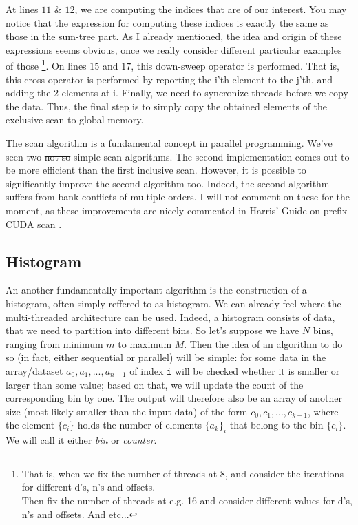 At lines $11$ \& $12$, we are computing the indices that are of our interest. You may notice that the 
expression for computing these indices is exactly the same as those in the sum-tree part. As I already 
mentioned, the idea and origin of these expressions seems obvious, once we really consider different 
particular examples of those \footnote{That is, when we fix the number of threads at 8, and consider the iterations for different d's, n's and offsets. \\
Then fix the number of threads at e.g. 16 and consider different values for d's, n's and offsets. And 
etc...}. On lines $15$ and $17$, this down-sweep operator is performed. That is, this cross-operator 
is performed by reporting the i'th element to the j'th, and adding the 2 elements at i.
Finally, we need to syncronize threads before we copy the data. Thus, the final step is to simply copy 
the obtained elements of the exclusive scan to global memory.


The scan algorithm is a fundamental concept in parallel programming. We've seen two \sout{not-so} simple scan algorithms. 
The second implementation comes out to be more efficient than the first inclusive scan. However, it is possible to significantly improve the 
second algorithm too. Indeed, the second algorithm suffers from bank conflicts of multiple orders. I will not comment on these for the moment, 
as these improvements are nicely commented in Harris' Guide on prefix CUDA scan \cite{harris_chapter_nodate}. 

\subsection{Histogram}
An another fundamentally important algorithm is the construction of a histogram, often simply reffered to as histogram.
We can already feel where the multi-threaded architecture can be used. Indeed, a histogram consists of data, that 
we need to partition into different bins. So let's suppose we have $N$ bins, ranging from minimum $m$ to maximum $M$.
Then the idea of an algorithm to do so (in fact, either sequential or parallel) 
will be simple: for some data in the array/dataset $a_0, a_1, ..., a_{n-1}$ of index \verb|i| will be checked whether it is smaller or larger than some value; based 
on that, we will update the count of the corresponding bin by one. The output will therefore also be 
an array of another size (most likely smaller than the input data) of the form $c_0, c_1, ..., c_{k-1}$, where 
the element $\{c_i\}$ holds the number of elements $\{a_k\}_i$ that belong to the bin $\{c_i\}$. We will call it 
either \textit{bin} or \textit{counter}.

